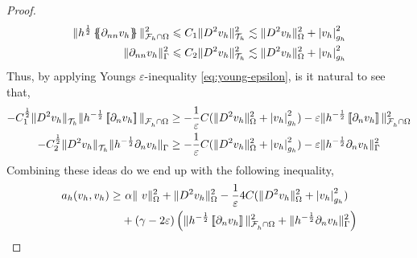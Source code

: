 \begin{proof}
    \begin{equation}
        \begin{split}
     \| h^{\frac{1}{2}} \left\{\!\!\left\{ \partial _{nn}v_{h} \right\}\!\!\right\} \|_{ \mathcal{F}_{h} \cap \Omega    }^{  2} & \leqslant C_{1} \| D^2 v_{h} \|_{ \mathcal{T}_{h}   }^{2  } \lesssim   \| D^2 v_{h} \|_{ \Omega  }^{ 2 }  + \left\lvert  v_{h}  \right\rvert _{ g_{h} }^{2  }   \\
     \|  \partial _{nn}v_{h}  \|_{ \Gamma     }^{ 2 } & \leqslant C_{2} \| D^2 v_{h} \|_{ \mathcal{T} _{h}  }^{2  } \lesssim    \| D^2 v_{h} \|_{ \Omega  }^{ 2 }  + \left\lvert  v_{h}  \right\rvert _{ g_{h} }^{2  }
        \end{split}
    \end{equation}
    Thus, by applying Youngs $\varepsilon $-inequality \eqref{eq:young-epsilon}, is it natural to see that,
    \begin{equation}
        \begin{split}
- C_{1}^{\frac{1}{2}} \| D^2 v_{h}    \|_{ \mathcal{T} _{h}   }^{  }  \|h^{-\frac{1}{2}} \left[\!\left[  \partial _{n} v_{h}  \right]\!\right]   \|_{ \mathcal{F}^{}_{h}\cap \Omega   }^{  }
& \ge - \frac{1}{\varepsilon } C  (\| D^2 v_{h} \|_{ \Omega  }^{ 2 }  + \left\lvert  v_{h}  \right\rvert _{ g_{h} }^{2  } ) -  \varepsilon \|h^{-\frac{1}{2}} \left[\!\left[  \partial _{n} v_{h}  \right]\!\right]   \|_{ \mathcal{F}^{}_{h}\cap \Omega   }^{2  } \\
- C_{2}^{\frac{1}{2}}  \| D^2 v_{h} \|_{ \mathcal{T} _{h} }^{  } \| h^{-\frac{1}{2}}  \partial _{n} v_{h}    \|_{ \Gamma    }^{  }
& \ge - \frac{1}{\varepsilon } C  (\| D^2 v_{h} \|_{ \Omega  }^{ 2 }  + \left\lvert  v_{h}  \right\rvert _{ g_{h} }^{2  } ) -  \varepsilon \|h^{-\frac{1}{2}}  \partial _{n} v_{h}    \|_{ \Gamma    }^{2  } \\
        \end{split}
    \end{equation}
    Combining these ideas do we end up with the following inequality,
    \begin{equation}
    \begin{split}
       a_{h}( v_{h},v_{h})  \ge& \  \alpha     \|\  v  \|_{   \Omega   }^{2} +\| D^2v_{h}  \|_{   \Omega   }^{2} -  \frac{1}{\varepsilon } 4C  (\| D^2 v_{h} \|_{ \Omega  }^{ 2 }  + \abs{ v_{h} } _{ g_{h} }^{2  } )  \\
                       & + (\gamma - 2\varepsilon  )\left( \|h^{-\frac{1}{2}}  \jump{ \partial _{n} v_{h} }\|_{\mathcal{F} _{h}^{} \cap \Omega   }^{ 2 } + \| h^{-\frac{1}{2}} \partial _{n} v_{h} \|_{ \Gamma  }^{ 2} \right)        \\
    \end{split}

\end{equation}
\end{proof}
